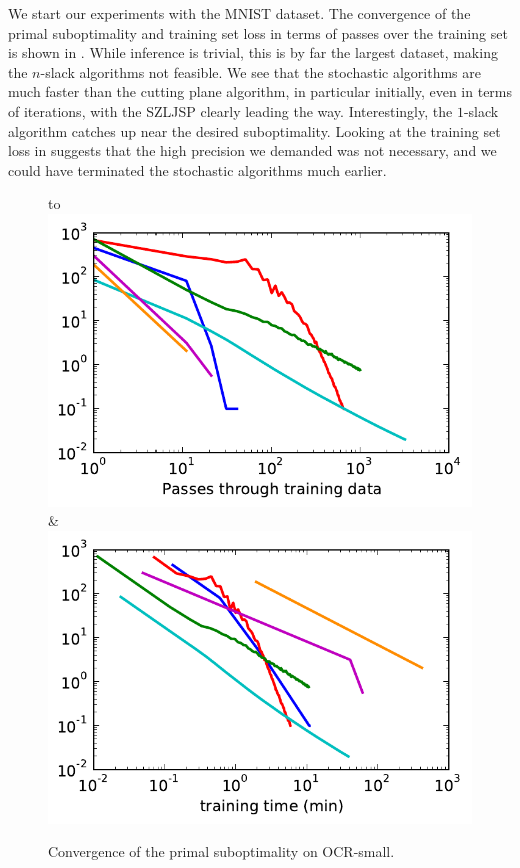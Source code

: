 We start our experiments with the MNIST dataset.
The convergence of the primal suboptimality and training set loss in terms of
passes over the training set is shown in . While inference
is trivial, this is by far the largest dataset, making the $n$-slack algorithms
not feasible. We see that the stochastic algorithms are much faster than the
cutting plane algorithm, in particular initially, even in terms of iterations,
with the SZLJSP clearly leading the way.
Interestingly, the $1$-slack algorithm catches up near the desired
suboptimality.  Looking at the training set loss in 
suggests that the high precision we demanded was not necessary, and we could
have terminated the stochastic algorithms much earlier.



\begin{figure}
    \begin{tabu} to 
    \\[-3mm]
    \includegraphics[width=\linewidth]{evaluation/images/letters_small_log}&%
    \includegraphics[width=\linewidth]{evaluation/images/letters_small_log_time}
    \end{tabu}
\caption{%
   Convergence of the primal suboptimality on OCR-small. 
}
\end{figure}

